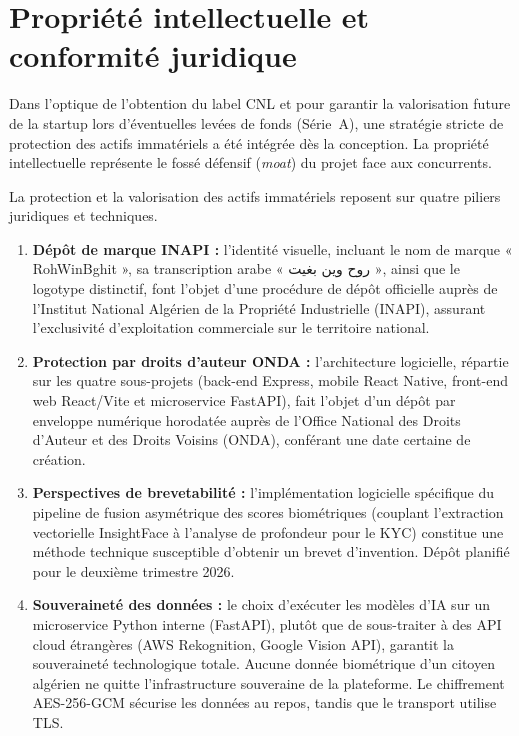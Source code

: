 \section{Propriété intellectuelle et conformité juridique}

Dans l'optique de l'obtention du label CNL et pour garantir la valorisation future de la startup lors d'éventuelles levées de fonds (Série~A), une stratégie stricte de protection des actifs immatériels a été intégrée dès la conception. La propriété intellectuelle représente le fossé défensif (\textit{moat}) du projet face aux concurrents.

La protection et la valorisation des actifs immatériels reposent sur quatre piliers juridiques et techniques.
\begin{enumerate}
  \item \textbf{Dépôt de marque INAPI :} l'identité visuelle, incluant le nom de marque « RohWinBghit », sa transcription arabe « \textarabic{روح وين بغيت} », ainsi que le logotype distinctif, font l'objet d'une procédure de dépôt officielle auprès de l'Institut National Algérien de la Propriété Industrielle (INAPI), assurant l'exclusivité d'exploitation commerciale sur le territoire national.
  \item \textbf{Protection par droits d'auteur ONDA :} l'architecture logicielle, répartie sur les quatre sous-projets (back-end Express, mobile React Native, front-end web React/Vite et microservice FastAPI), fait l'objet d'un dépôt par enveloppe numérique horodatée auprès de l'Office National des Droits d'Auteur et des Droits Voisins (ONDA), conférant une date certaine de création.
  \item \textbf{Perspectives de brevetabilité :} l'implémentation logicielle spécifique du pipeline de fusion asymétrique des scores biométriques (couplant l'extraction vectorielle InsightFace à l'analyse de profondeur pour le KYC) constitue une méthode technique susceptible d'obtenir un brevet d'invention. Dépôt planifié pour le deuxième trimestre 2026.
  \item \textbf{Souveraineté des données :} le choix d'exécuter les modèles d'IA sur un microservice Python interne (FastAPI), plutôt que de sous-traiter à des API cloud étrangères (AWS Rekognition, Google Vision API), garantit la souveraineté technologique totale. Aucune donnée biométrique d'un citoyen algérien ne quitte l'infrastructure souveraine de la plateforme. Le chiffrement AES-256-GCM sécurise les données au repos, tandis que le transport utilise TLS.
\end{enumerate}

